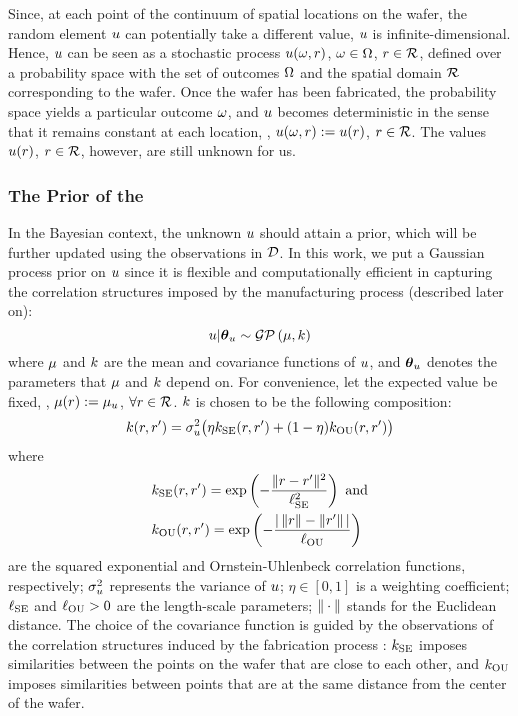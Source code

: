 Since, at each point of the continuum of spatial locations on the wafer, the random element $u$ can potentially take a different value, $u$ is infinite-dimensional.
Hence, $u$ can be seen as a stochastic process $u(\omega, r)$, $\omega \in \Omega$, $r \in \mathcal{R}$, defined over a probability space with the set of outcomes $\Omega$ \cite{durrett2010} and the spatial domain $\mathcal{R}$ corresponding to the wafer.
Once the wafer has been fabricated, the probability space yields a particular outcome $\omega$, and $u$ becomes deterministic in the sense that it remains constant at each location, \ie, $u(\omega, r) := u(r)$, $r \in \mathcal{R}$.
The values $u(r)$, $r \in \mathcal{R}$, however, are still unknown for us.

\subsubsection{The Prior of the \qoi}
In the Bayesian context, the unknown $u$ should attain a prior, which will be further updated using the observations in $\mathcal{D}$. In this work, we put a Gaussian process prior \cite{rasmussen2006} on $u$ since it is flexible and computationally efficient in capturing the correlation structures imposed by the manufacturing process (described later on):
\[
  \u | \vparam_\u \sim \gaussianp{\fMean}{\fCov}
\]
where $\fMean$ and $\fCov$ are the mean and covariance functions of $u$, and ${\boldsymbol\theta}_u$ denotes the parameters that $\fMean$ and $\fCov$ depend on. For convenience, let the expected value be fixed, \ie, $\fMean{\r} := \mu_\u$, $\forall r \in \mathcal{R}$.
$\fCov$ is chosen to be the following composition:
\begin{equation} \elabel{covariance-function}
  \fCov{\r, \r'} = \sigma_\u^2 \big( \eta \fCov_\SE(\r, \r') + (1 - \eta) \fCov_\OU(\r, \r') \big)
\end{equation}
where
\begin{align*}
  & \fCov_\SE(\r, \r') = \exp\left(-\frac{\norm{\r - \r'}^2}{\ell_\SE^2}\right) \text{ and} \\
  & \fCov_\OU(\r, \r') = \exp\left(- \frac{\abs{\,\norm{\r} - \norm{\r'}\,}}{\ell_\OU} \right)
\end{align*}
are the squared exponential and Ornstein-Uhlenbeck correlation functions, respectively; $\sigma_u^2$ represents the variance of $u$; $\eta \in [0, 1]$ is a weighting coefficient; $\ell_{\text{SE}}$ and $\ell_{\text{OU}} > 0$ are the length-scale parameters; $\| \cdot \|$ stands for the Euclidean distance.
The choice of the covariance function is guided by the observations of the correlation structures induced by the fabrication process \cite{chandrakasan2001, cheng2011}: $\fCov_\SE$ imposes similarities between the points on the wafer that are close to each other, and $\fCov_\OU$ imposes similarities between points that are at the same distance from the center of the wafer.
